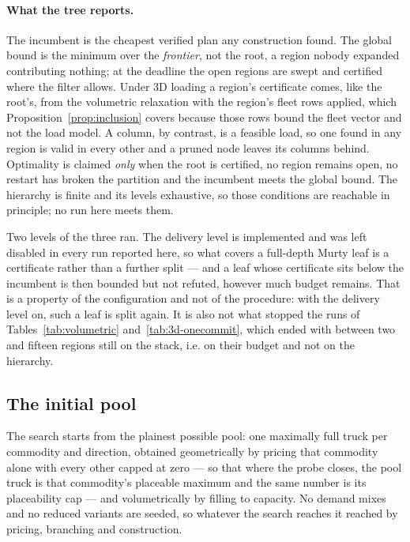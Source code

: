 \paragraph{What the tree reports.}
The incumbent is the cheapest verified plan any construction found. The
global bound is the minimum over the \emph{frontier}, not the root, a
region nobody expanded contributing nothing; at the deadline the open
regions are swept and certified where the filter allows. Under 3D
loading a region's certificate comes, like the root's, from the
volumetric relaxation with the region's fleet rows applied, which
Proposition~\ref{prop:inclusion} covers because those rows bound the
fleet vector and not the load model. A column, by contrast, is a
feasible load, so one found in any region is valid in every other and a
pruned node leaves its columns behind. Optimality is claimed
\emph{only} when the root is certified, no region remains open, no
restart has broken the partition and the incumbent meets the global
bound. The hierarchy is finite and its levels exhaustive, so those
conditions are reachable in principle; no run here meets them.

Two levels of the three ran. The delivery level is implemented and was
left disabled in every run reported here, so what covers a full-depth
Murty leaf is a certificate rather than a further split --- and a leaf
whose certificate sits below the incumbent is then bounded but not
refuted, however much budget remains. That is a property of the
configuration and not of the procedure: with the delivery level on,
such a leaf is split again.
It is also not what stopped the runs of
Tables~\ref{tab:volumetric} and~\ref{tab:3d-onecommit}, which ended
with between two and fifteen regions still on the stack, i.e. on their
budget and not on the hierarchy.



\subsection{The initial pool}
\label{sec:initcols}
The search starts from the plainest possible pool: one maximally full
truck per commodity and direction, obtained geometrically by pricing
that commodity alone with every other capped at zero --- so that where
the probe closes, the pool truck is that commodity's placeable maximum
and the same number is its placeability cap --- and volumetrically by
filling to capacity. No demand mixes and no reduced variants are
seeded, so whatever the search reaches it reached by pricing, branching
and construction.

